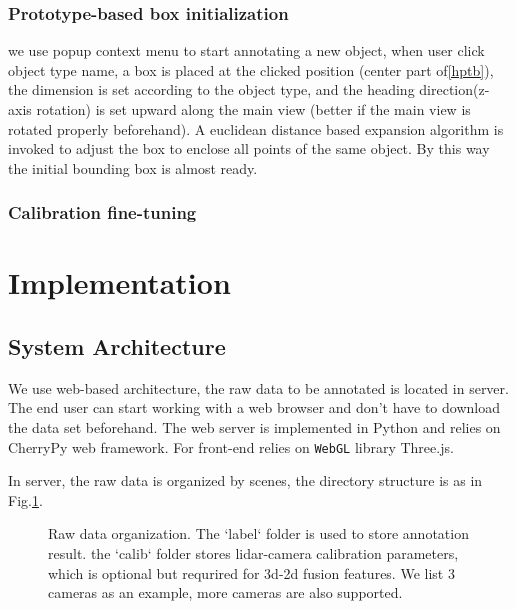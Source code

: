\documentclass[letterpaper, 10 pt, conference]{ieeeconf}  %
\begin{document}
\subsubsection{Prototype-based box initialization}

we use popup context menu to start annotating a new object, when user click object type name, a box is placed at the clicked position (center part of\ref{hptb}), the dimension is set according to the object type, and the heading direction(z-axis rotation) is set upward along the main view (better if the main view is rotated properly beforehand).
A euclidean distance based expansion algorithm is invoked to adjust the box to enclose all points of the same object. By this way the initial bounding box is almost ready.

\subsubsection{Calibration fine-tuning}

\section{Implementation}
\label{Implementation}

\subsection{System Architecture}
We use web-based architecture, the raw data to be annotated is located in server. The end user can start working with a web browser and don't have to download the data set beforehand. The web server is implemented in Python and relies on CherryPy web framework\cite{cherrypy}. For front-end relies on \texttt{WebGL} library Three.js\cite{threejs}.

In server, the raw data is organized by scenes, the directory structure is as in Fig.\ref{fig:data-dir}.

\begin{figure}

\caption{Raw data organization. The `label` folder is used to store annotation result. the `calib` folder stores lidar-camera calibration parameters, which is optional but requrired for 3d-2d fusion features. We list 3 cameras as an example, more cameras are also supported.}
\label{fig:data-dir}
\end{figure}
\end{document}
